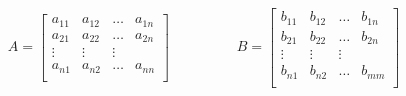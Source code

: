 \begin{eqnarray*}
A = \begin{bmatrix}
a_{11} & a_{12} & \ldots & a_{1n} \\
a_{21} & a_{22} & \ldots & a_{2n} \\
\vdots & \vdots & \vdots & \\
a_{n1} & a_{n2} & \ldots & a_{nn} \\
\end{bmatrix}
\hspace{2cm}
B = \begin{bmatrix}
b_{11} & b_{12} & \ldots & b_{1n} \\
b_{21} & b_{22} & \ldots & b_{2n} \\
\vdots & \vdots & \vdots & \\
b_{n1} & b_{n2} & \ldots & b_{mm} \\
\end{bmatrix}
\end{eqnarray*}
